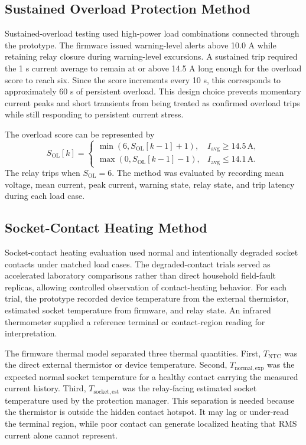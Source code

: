 \documentclass[conference,a4paper]{template/IEEEtran}
\begin{document}
\subsection{Sustained Overload Protection Method}

Sustained-overload testing used high-power load combinations connected through the
prototype. The firmware issued warning-level alerts above 10.0 A while
retaining relay closure during warning-level excursions. A sustained trip
required the 1 s current average to remain at or above 14.5 A long
enough for the overload score to reach six. Since the score increments
every 10 s, this corresponds to approximately 60 s of persistent
overload. This design choice prevents
momentary current peaks and short transients from being treated as
confirmed overload trips while still responding to persistent current
stress.

The overload score can be represented by
\begin{equation}
S_{\mathrm{OL}}[k]=
\begin{cases}
\min(6,S_{\mathrm{OL}}[k-1]+1), & I_{\mathrm{avg}}\geq14.5\,\mathrm{A},\\
\max(0,S_{\mathrm{OL}}[k-1]-1), & I_{\mathrm{avg}}\leq14.1\,\mathrm{A}.
\end{cases}
\end{equation}
The relay trips when $S_{\mathrm{OL}}=6$. The method was evaluated by
recording mean voltage, mean current, peak current, warning state, relay
state, and trip latency during each load case.

\subsection{Socket-Contact Heating Method}

Socket-contact heating evaluation used normal and intentionally degraded socket
contacts under matched load cases. The degraded-contact trials served as
accelerated laboratory comparisons rather than direct household field-fault
replicas, allowing controlled observation of contact-heating behavior. For
each trial, the prototype recorded device temperature from
the external thermistor, estimated socket temperature from firmware, and
relay state. An infrared thermometer supplied a reference terminal or
contact-region reading for interpretation.

The firmware thermal model separated three thermal quantities. First,
$T_{\mathrm{NTC}}$ was the direct external thermistor or device
temperature. Second, $T_{\mathrm{normal,exp}}$ was the expected normal
socket temperature for a healthy contact carrying the measured current
history. Third, $T_{\mathrm{socket,est}}$ was the relay-facing estimated
socket temperature used by the protection manager. This separation is
needed because the thermistor is outside the hidden contact hotspot. It
may lag or under-read the terminal region, while poor contact can generate
localized heating that RMS current alone cannot represent.
\end{document}
